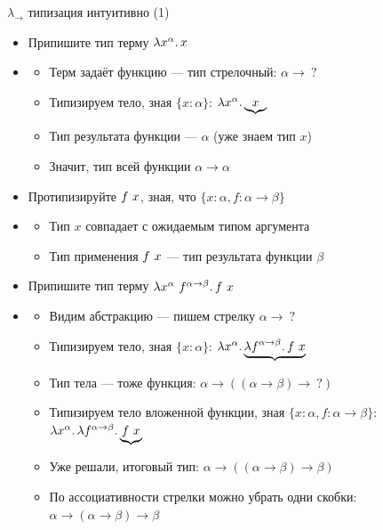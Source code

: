    \begin{frame}[fragile]{$\lambda_\to$ типизация интуитивно (1)}
        \begin{itemize}
            \item[\todo] Припишите тип терму $\lambda x^{\alpha}\ldotp x$
            \item[\answer] \pause
            \begin{itemize}
                \item Терм задаёт функцию --- тип стрелочный: $\alpha \to ~?$
                \item Типизируем тело, зная $\{x : \alpha\}$: $\lambda x^\alpha\ldotp \underbrace{x}$
                \item Тип результата функции --- $\alpha$ (уже знаем тип $x$)
                \item Значит, тип всей функции $\alpha \to \alpha$
            \end{itemize}
            \item[\todo] Протипизируйте $f ~ x$, зная, что $\{x : \alpha, f : \alpha\to\beta\}$
            \item[\answer] \pause
            \begin{itemize}
                \item Тип $x$ совпадает с ожидаемым типом аргумента
                \item Тип применения $f ~ x$ --- тип результата функции $\beta$
            \end{itemize}
            \item[\todo] Припишите тип терму $\lambda x^\alpha~f^{\alpha \to \beta}\ldotp f ~ x$
            \item[\answer] \pause
            \begin{itemize}
                \item Видим абстракцию --- пишем стрелку $\alpha \to ~?$
                \item Типизируем тело, зная $\{x : \alpha\}$: $\lambda x^\alpha \ldotp \underbrace{\lambda f^{\alpha \to \beta}\ldotp f ~ x}$
                \item Тип тела --- тоже функция: $\alpha \to ((\alpha \to \beta) \to ~?)$
                \item Типизируем тело вложенной функции, зная $\{x : \alpha, f : \alpha \to \beta\}$: $\lambda x^\alpha \ldotp \lambda f^{\alpha \to \beta}\ldotp \underbrace{f ~ x}$
                \item Уже решали, итоговый тип: $\alpha \to ((\alpha \to \beta) \to \beta)$
                \item По ассоциативности стрелки можно убрать одни скобки: $\alpha \to (\alpha \to \beta) \to \beta$
            \end{itemize}
        \end{itemize}
    \end{frame}

